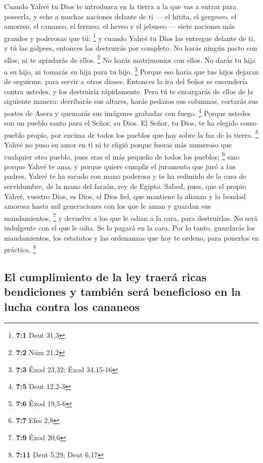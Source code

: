  Cuando Yahvé tu Dios te introduzca en la tierra a la que
vas a entrar para poseerla, y eche a muchas naciones delante de ti ---
el hitita, el gergeseo, el amorreo, el cananeo, el ferezeo, el heveo y
el jebuseo --- siete naciones más grandes y poderosas que tú;
\footnote{\textbf{7:1} Deut 31,3}  y cuando Yahvé tu Dios
las entregue delante de ti, y tú las golpees, entonces las destruirás
por completo. No harás ningún pacto con ellos, ni te apiadarás de ellos.
\footnote{\textbf{7:2} Núm 21,2}  No harás matrimonios con
ellos. No darás tu hija a su hijo, ni tomarás su hija para tu hijo.
\footnote{\textbf{7:3} Éxod 23,32; Éxod 34,15-16}  Porque
eso haría que tus hijos dejaran de seguirme, para servir a otros dioses.
Entonces la ira del Señor se encendería contra ustedes, y los destruiría
rápidamente.  Pero tú te encargarás de ellos de la
siguiente manera: derribarás sus altares, harás pedazos sus columnas,
cortarás sus postes de Asera y quemarás sus imágenes grabadas con fuego.
\footnote{\textbf{7:5} Deut 12,2-3}  Porque ustedes son un
pueblo santo para el Señor, su Dios. El Señor, tu Dios, te ha elegido
como pueblo propio, por encima de todos los pueblos que hay sobre la faz
de la tierra. \footnote{\textbf{7:6} Éxod 19,5-6}  Yahvé
no puso su amor en ti ni te eligió porque fueras más numeroso que
cualquier otro pueblo, pues eras el más pequeño de todos los pueblos;
\footnote{\textbf{7:7} Efes 2,8}  sino porque Yahvé te
ama, y porque quiere cumplir el juramento que juró a tus padres, Yahvé
te ha sacado con mano poderosa y te ha redimido de la casa de
servidumbre, de la mano del faraón, rey de Egipto.  Sabed,
pues, que el propio Yahvé, vuestro Dios, es Dios, el Dios fiel, que
mantiene la alianza y la bondad amorosa hasta mil generaciones con los
que le aman y guardan sus mandamientos, \footnote{\textbf{7:9} Éxod 20,6}
 y devuelve a los que le odian a la cara, para
destruirlos. No será indulgente con el que le odia. Se lo pagará en la
cara.  Por lo tanto, guardarás los mandamientos, los
estatutos y las ordenanzas que hoy te ordeno, para ponerlos en práctica.
\footnote{\textbf{7:11} Deut 5,29; Deut 6,17}

\hypertarget{el-cumplimiento-de-la-ley-traeruxe1-ricas-bendiciones-y-tambiuxe9n-seruxe1-beneficioso-en-la-lucha-contra-los-cananeos}{%
\subsection{El cumplimiento de la ley traerá ricas bendiciones y también
será beneficioso en la lucha contra los
cananeos}\label{el-cumplimiento-de-la-ley-traeruxe1-ricas-bendiciones-y-tambiuxe9n-seruxe1-beneficioso-en-la-lucha-contra-los-cananeos}}

